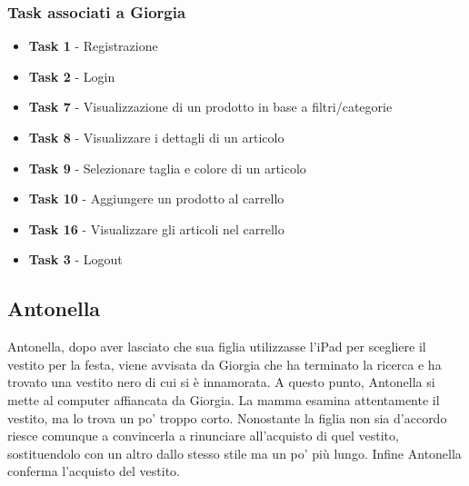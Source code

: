 \documentclass[12pt,a4paper]{report}
\begin{document}
\subsubsection*{Task associati a Giorgia}
\begin{itemize}
\item \textbf{Task 1} - Registrazione
\item \textbf{Task 2} - Login
\item \textbf{Task 7} - Visualizzazione di un prodotto in base a filtri/categorie
\item \textbf{Task 8} - Visualizzare i dettagli di un articolo
\item \textbf{Task 9} - Selezionare taglia e colore di un articolo
\item \textbf{Task 10} - Aggiungere un prodotto al carrello
\item \textbf{Task 16} - Visualizzare gli articoli nel carrello
\item \textbf{Task 3} - Logout
\end{itemize}
\subsection*{Antonella}
Antonella, dopo aver lasciato che sua figlia utilizzasse l'iPad per scegliere il vestito per la festa, viene avvisata da Giorgia che ha terminato la ricerca e ha trovato una vestito nero di cui si è innamorata. A questo punto, Antonella si mette al computer affiancata da Giorgia. La mamma esamina attentamente il vestito, ma lo trova un po' troppo corto. Nonostante la figlia non sia d'accordo riesce comunque a convincerla a rinunciare all’acquisto di quel vestito, sostituendolo con un altro dallo stesso stile ma un po' più lungo. Infine Antonella conferma l’acquisto del vestito.
\end{document}
